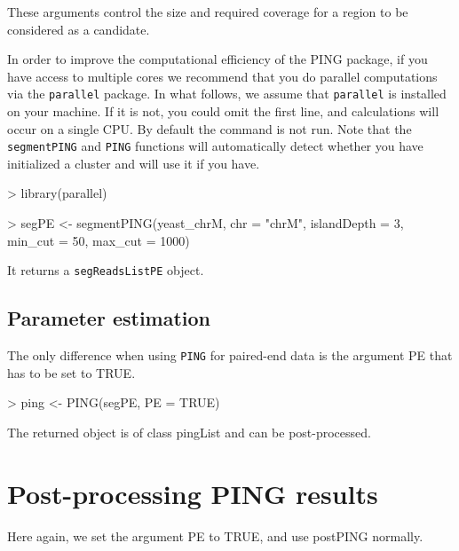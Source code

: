 \documentclass[11pt]{article}
\begin{document}
These arguments control the size and required coverage for a region to be
considered as a candidate.

In order to improve the computational efficiency of the PING package, if you
have access to multiple cores we recommend that you do parallel computations via
the \texttt{parallel} package. In what follows, we assume that \texttt{parallel}
is installed on your machine. If it is not, you could omit the first line, and
calculations will occur on a single CPU. By default the command is not run. Note
that the \texttt{segmentPING} and \texttt{PING} functions will automatically
detect whether you have initialized a cluster and will use it if you have.

\begin{Schunk}
\begin{Sinput}
> library(parallel)
\end{Sinput}
\end{Schunk}


\begin{Schunk}
\begin{Sinput}
> segPE <- segmentPING(yeast_chrM, chr = "chrM", islandDepth = 3, 
     min_cut = 50, max_cut = 1000)
\end{Sinput}
\end{Schunk}
It returns a \texttt{segReadsListPE} object.


\subsection{Parameter estimation}
The only difference when using \texttt{PING} for paired-end data is the argument PE that has to be set to TRUE.

\begin{Schunk}
\begin{Sinput}
> ping <- PING(segPE, PE = TRUE)
\end{Sinput}
\end{Schunk}
The returned object is of class pingList and can be post-processed.


\section{Post-processing PING results}
Here again, we set the argument PE to TRUE, and use postPING normally.
\end{document}
